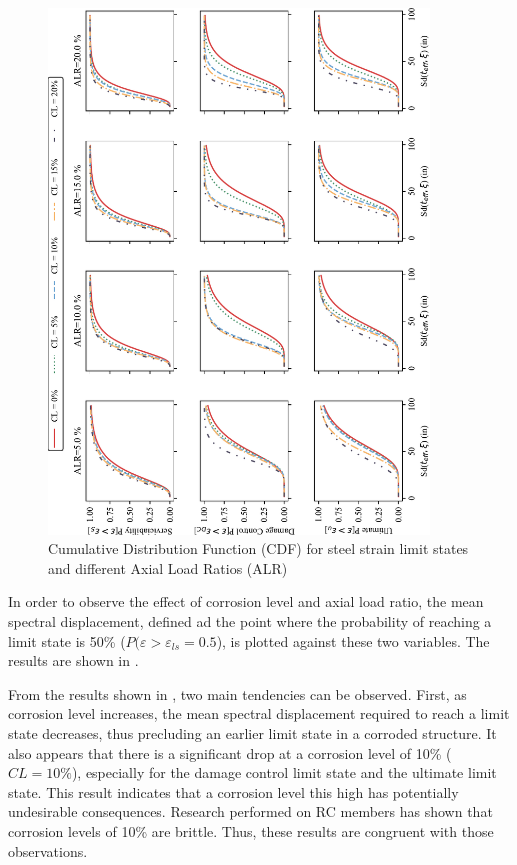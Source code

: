 \begin{figure}[htbp]
	\centering
	\includegraphics[width=0.9\textwidth]{VAC Thesis 2.0/Chapter-5/figs/CDF_summary.pdf}
	\caption{Cumulative Distribution Function (CDF) for steel strain limit states and different Axial Load Ratios (ALR)}
	\label{fig:CDF_strain_vs_ALR}
\end{figure}

In order to observe the effect of corrosion level and axial load ratio, the mean spectral displacement, defined ad the point where the probability of reaching a limit state is 50\% ($P(\varepsilon>\varepsilon_{ls}=0.5$), is plotted against these two variables. The results are shown in .

From the results shown in , two main tendencies can be observed. First, as corrosion level increases, the mean spectral displacement required to reach a limit state decreases, thus precluding an earlier limit state in a corroded structure. It also appears that there is a significant drop at a corrosion level of 10\% ($CL=10\%$), especially for the damage control limit state and the ultimate limit state. This result indicates that a corrosion level this high has potentially undesirable consequences. Research performed on RC members has shown that corrosion levels of 10\% are brittle. Thus, these results are congruent with those observations.

